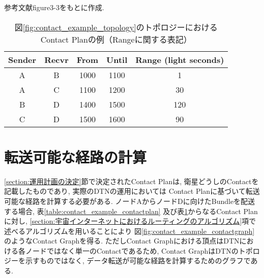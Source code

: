 \begin{table}[htbp]
    \centering
    \caption{図\ref{fig:contact_example_topology}のトポロジーにおけるContact Planの例（Rangeに関する表記）}
    \label{table:contact_example_contactrange}
    \begin{minipage}{\textwidth}
        \centering
        \vspace{2mm}
        \fontsize{10.5pt}{12pt}\selectfont
        参考文献\cite{schedule_aware_bundle_routing}figure3-3をもとに作成.  
        \vspace{2mm}
    \end{minipage}
    \begin{tabular}{ccccc}
        \hline
        Sender & Recvr & From & Until & Range (light seconds) \\
        \hline
        A & B & 1000 & 1100 & 1 \\
        A & C & 1100 & 1200 & 30 \\
        B & D & 1400 & 1500 & 120 \\
        C & D & 1500 & 1600 & 90 \\
        \hline
    \end{tabular}
  \end{table}

\section{転送可能な経路の計算}
\label{section:経路決定}

\ref{section:運用計画の決定}節で決定されたContact Planは, 
衛星どうしのContactを記載したものであり, 実際のDTNの運用においては
Contact Planに基づいて転送可能な経路を計算する必要がある.  
ノードAからノードDに向けたBundleを配送する場合, 
表\ref{table:contact_example_contactplan}
及び表\ref{table:contact_example_contactrange}からなるContact Planに対し, 
\ref{section:宇宙インターネットにおけるルーティングのアルゴリズム}項で述べるアルゴリズムを用いることにより
図\ref{fig:contact_example_contactgraph}のようなContact Graphを得る.  
ただしContact Graphにおける頂点はDTNにおける各ノードではなく単一のContactであるため, 
Contact GraphはDTNのトポロジーを示すものではなく, データ転送が可能な経路を計算するためのグラフである.  



